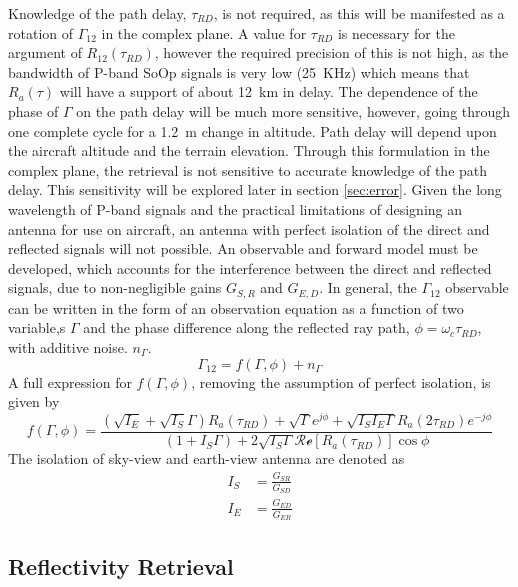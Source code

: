 \documentclass[draftcls,onecolumn]{IEEEtran}  %
\begin{document}
Knowledge of the path delay, $\tau_{RD}$, is not required, as this will be manifested as a rotation of $\Gamma_{12}$ in the complex plane. 
A value for $\tau_{RD}$ is necessary for the argument of $R_{12}(\tau_{RD})$, however the required precision of this is not high, as the bandwidth of P-band SoOp signals is very low (25~KHz) which means that $R_a(\tau)$ will have a support of about 12~km in delay.  
The dependence of the phase of $\Gamma$ on the path delay will be much more sensitive, however, going through one complete cycle for a 1.2~m change in altitude.  
Path delay will depend upon the aircraft altitude and the terrain elevation. 
Through this formulation in the complex plane, the retrieval is not sensitive to accurate knowledge of the path delay.  This sensitivity will be explored later in section \ref{sec:error}.
Given the long wavelength of P-band signals and the practical limitations of designing an antenna for use on aircraft, an antenna with perfect isolation of the direct and reflected signals will not possible. 
An observable and forward model must be developed, which accounts for the interference between the direct and reflected signals, due to non-negligible gains $G_{S,R}$ and $G_{E,D}$.  In general, the $\Gamma_{12}$ observable can be written in the form of an observation equation as a function of two variable,s $\Gamma$ and the phase difference along the reflected ray path, $\phi = \omega_c \tau_{RD}$, with  additive noise.  $n_{\Gamma}$. 
\begin{equation}
\Gamma_{12} = f(\Gamma, \phi) +n_{\Gamma}
  \label{eqn:observation_eqn_general}
\end{equation}
A full expression for $f(\Gamma, \phi)$, removing the assumption of perfect isolation, is given by
\begin{equation}
f(\Gamma, \phi) =
	\frac{(\sqrt{I_E}+\sqrt{I_S}\Gamma)R_a(\tau_{RD})+\sqrt{\Gamma} 
    e^{j\phi}+\sqrt{I_S I_E\Gamma} R_a(2\tau_{RD})e^{-j\phi}} 
    {(1 + I_S \Gamma) + 2 \sqrt{I_S \Gamma} \mathcal{Re}[ R_a(\tau_{RD})] \cos \phi}
        \label{Eq:Gamma_estimation}
\end{equation}
%
The isolation of sky-view and earth-view antenna are denoted as
\begin{eqnarray}
    I_S& = \frac{G_{SR}}{G_{SD}}\\
   I_E& = \frac{G_{ED}}{G_{ER}}
\end{eqnarray}

\subsection{Reflectivity Retrieval}  \label{sec: Reflectivity Retrieval}
\end{document}
